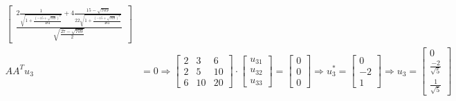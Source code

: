 \documentclass[a4paper, spanish]{article}
\begin{document}
\begin{align}
\begin{bmatrix}
        \frac{2\frac{1}{\sqrt{1 + \frac{(- 15 + \sqrt{709})^2}{484}}} +4
        \frac{15 - \sqrt{709}}{22\sqrt{1 + \frac{(- 15 + \sqrt{709})^2}{484}}}}{\sqrt{\frac{27 - \sqrt{709}}{2}}}
      \end{bmatrix} \\
      AA^T u_3 &= 0
      \Rightarrow
      \begin{bmatrix}
        2 & 3 & 6 \\
        2 & 5 & 10 \\
        6 & 10 & 20
      \end{bmatrix}
      \cdot
      \begin{bmatrix}
        u_{31} \\
        u_{32} \\
        u_{33}
      \end{bmatrix}
      =
      \begin{bmatrix}
        0 \\
        0 \\
        0
      \end{bmatrix}
      \Rightarrow
      u_3^* =
      \begin{bmatrix}
        0 \\
        -2 \\
        1
      \end{bmatrix}
      \Rightarrow
      u_3 =
      \begin{bmatrix}
        0 \\
        \frac{-2}{\sqrt{5}} \\
        \frac{1}{\sqrt{5}}
      \end{bmatrix}
    \end{align}
\end{document}
